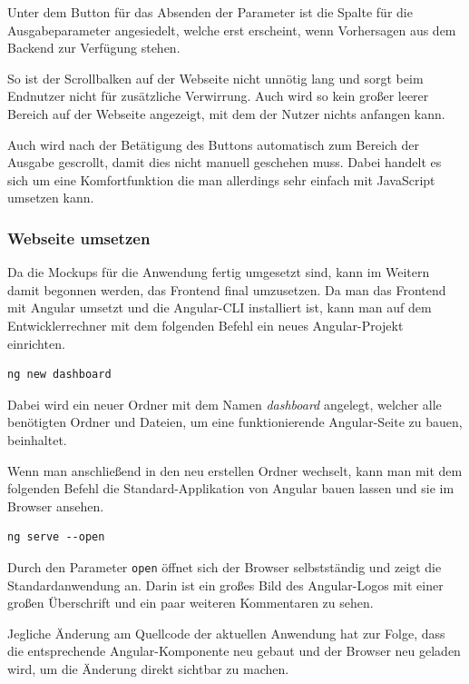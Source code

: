 Unter dem Button für das Absenden der Parameter ist die Spalte für die Ausgabeparameter angesiedelt, welche erst
erscheint, wenn Vorhersagen aus dem Backend zur Verfügung stehen.

So ist der Scrollbalken auf der Webseite nicht unnötig lang und sorgt beim Endnutzer nicht für zusätzliche Verwirrung.
Auch wird so kein großer leerer Bereich auf der Webseite angezeigt, mit dem der Nutzer nichts anfangen kann.

Auch wird nach der Betätigung des Buttons automatisch zum Bereich der Ausgabe gescrollt, damit dies nicht manuell
geschehen muss. Dabei handelt es sich um eine Komfortfunktion die man allerdings sehr einfach mit JavaScript umsetzen
kann.

\subsubsection{Webseite umsetzen}
Da die Mockups für die Anwendung fertig umgesetzt sind, kann im Weitern damit begonnen werden, das Frontend final
umzusetzen. Da man das Frontend mit Angular umsetzt und die Angular-CLI installiert ist, kann man auf dem
Entwicklerrechner mit dem folgenden Befehl ein neues Angular-Projekt einrichten.

\begin{lstlisting}[caption=Einrichten eines neuen Angular-Projektes, label=ls:umsetzung_angular]
    ng new dashboard
\end{lstlisting}

Dabei wird ein neuer Ordner mit dem Namen \textit{dashboard} angelegt, welcher alle benötigten Ordner und Dateien, um
eine funktionierende Angular-Seite zu bauen, beinhaltet.

Wenn man anschließend in den neu erstellen Ordner wechselt, kann man mit dem folgenden Befehl die Standard-Applikation
von Angular bauen lassen und sie im Browser ansehen.

\begin{lstlisting}[caption=Bereitstellen der Angular-Webseite, label=ls:umsetzung_angularserve]
    ng serve --open
\end{lstlisting}

Durch den Parameter \texttt{open} öffnet sich der Browser selbstständig und zeigt die Standardanwendung an. Darin ist
ein großes Bild des Angular-Logos mit einer großen Überschrift und ein paar weiteren Kommentaren zu sehen.

Jegliche Änderung am Quellcode der aktuellen Anwendung hat zur Folge, dass die entsprechende Angular-Komponente neu
gebaut und der Browser neu geladen wird, um die Änderung direkt sichtbar zu machen.

